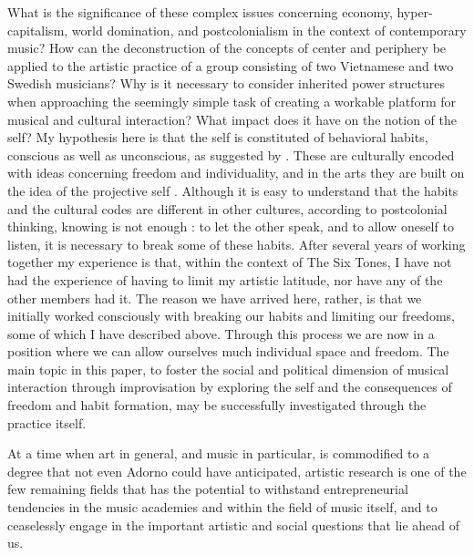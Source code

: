 \documentclass[a4paper]{article}
\begin{document}
What is the significance of these complex issues concerning economy, hyper-capitalism, world domination, and postcolonialism in the context of contemporary music?  How can the deconstruction of the concepts of center and periphery be applied to the artistic practice of a group consisting of two Vietnamese and two Swedish musicians?  Why is it necessary to consider inherited power structures when approaching the seemingly simple task of creating a workable platform for musical and cultural interaction?  What impact does it have on the notion of the self?  My hypothesis here is that the self is constituted of behavioral habits, conscious as well as unconscious, as suggested by \autocite{bateson72:cyber-self}. These are culturally encoded with ideas concerning freedom and individuality, and in the arts they are built on the idea of the projective self \autocite{frisk2013}. Although it is easy to understand that the habits and the cultural codes are different in other cultures, according to postcolonial thinking, knowing is not enough \autocite[See e.g.][]{said2000,frisk-ost13}: to let the other speak, and to allow oneself to listen, it is necessary to break some of these habits. After several years of working together my experience is that, within the context of The Six Tones, I have not had the experience of having to limit my artistic latitude, nor have any of the other members had it. The reason we have arrived here, rather, is that we initially worked consciously with breaking our habits and limiting our freedoms, some of which I have described above. Through this process  we are now in a position where we can allow ourselves much individual space and freedom. The main topic in this paper, to foster the social and political dimension of musical interaction through improvisation by exploring the self and the consequences of freedom and habit formation, may be successfully investigated through the practice itself. 

At a time when art in general, and music in particular, is commodified to a degree that not even Adorno could have anticipated, artistic research is one of the few remaining fields that has the potential to withstand entrepreneurial tendencies in the music academies and within the field of music itself, and to ceaselessly engage in the important artistic and social questions that lie ahead of us.

\end{document}
